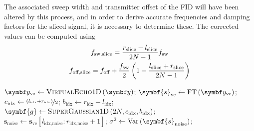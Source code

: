 The associated sweep width and transmitter offset of the \ac{FID} will have
been altered by this process, and in order to derive accurate frequencies and
damping factors for the sliced signal, it is necessary to determine these. The
corrected values can be computed using
\begin{subequations}
    \begin{gather}
        f_{\text{sw,slice}} = \frac{r_{\text{slice}} - l_{\text{slice}}}{2N - 1} f_{\mathrm{sw}}\\
        f_{\text{off,slice}} = f_{\text{off}} + \frac{f_{\mathrm{sw}}}{2} \left(
            1 - \frac{l_{\text{slice}} + r_{\text{slice}}}{2N - 1}
        \right)
    \end{gather}
\end{subequations}

\begin{algorithm}
    \begin{algorithmic}
        \caption[
            Filtering procedure for 1D data.
        ]
        {
            Filtering procedure for 1D data.
            $l_{\text{idx}}$ and $r_{\text{idx}}$ are indices of the left and
            right bounds of the region of interest.
            $l_{\text{idx,noise}}$ and $r_{\text{idx,noise}}$ are the analogous
            bounds for the noise region. All of these values should be $\in
            \lbrace 0, \cdots, 2N - 1 \rbrace$.
            These would typically be provided in units of \unit{\hertz} or
            \unit{\partspermillion} by a user; conversion to indices can
            be carried out using \cref{eq:fidx}.
        }
        \label{alg:filter-1d}
            \State $\by_{\text{ve}} \gets \textsc{VirtualEcho$1$D}\left(\by\right)$;
            \State $\symbf{s}_{\text{ve}} \gets \FT\left(\by_{\text{ve}}\right)$;
            \State $c_{\text{idx}} \gets \nicefrac{\left(l_{\text{idx}} + r_{\text{idx}}\right)}{2}$;
            \State $b_{\text{idx}} \gets r_{\text{idx}} - l_{\text{idx}}$;
            \State $\symbf{g} \gets \textsc{SuperGaussian$1$D}\left(2N, c_{\text{idx}}, b_{\text{idx}}\right)$;
            \State $\symbf{s}_{\text{noise}} \gets \symbf{s}_{\text{ve}} \left[
                l_{\text{idx,noise}} : r_{\text{idx,noise}} + 1
            \right]
            $;
            \State $\sigma^2 \gets \Var\left(\symbf{s}_{\text{noise}}\right)$;

\end{algorithmic}
\end{algorithm}
